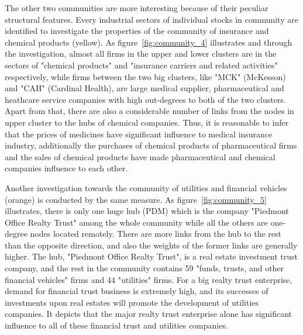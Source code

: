The other two communities are more interesting because of their peculiar structural features. Every industrial sectors of individual stocks in community are identified to investigate the properties of the community of insurance and chemical products (yellow). As figure~\ref{fig:community_4} illustrates and through the investigation, almost all firms in the upper and lower clusters are in the sectors of "chemical products" and "insurance carriers and related activities" respectively, while firms between the two big clusters, like "MCK" (McKesson) and "CAH" (Cardinal Health), are large medical supplier, pharmaceutical and heathcare service companies with high out-degrees to both of the two clusters. Apart from that, there are also a considerable number of links from the nodes in upper cluster to the hubs of chemical companies. Thus, it is reasonable to infer that the prices of medicines have significant influence to medical insurance industry, additionally the purchases of chemical products of pharmaceutical firms and the sales of chemical products have made pharmaceutical and chemical companies influence to each other.

Another investigation towards the community of utilities and financial vehicles (orange) is conducted by the same measure. As figure~\ref{fig:community_5} illustrates, there is only one huge hub (PDM) which is the company "Piedmont Office Realty Trust" among the whole community while all the others are one-degree nodes located remotely. There are more links from the hub to the rest than the opposite direction, and also the weights of the former links are generally higher. The hub, "Piedmont Office Realty Trust", is a real estate investment trust company, and the rest in the community contains 59 "funds, trusts, and other financial vehicles" firms and 44 "utilities" firms. For a big realty trust enterprise, demand for financial trust business is extremely high, and its successes of investments upon real estates will promote the development of utilities companies. It depicts that the major realty trust enterprise alone has significant influence to all of these financial trust and utilities companies.

